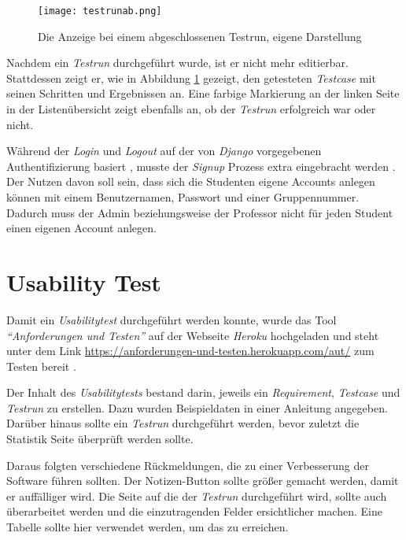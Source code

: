 \documentclass[11pt,a4paper]{report}
\begin{document}
\begin{figure}[htpb]
  \centering
  \texttt{[image: testrunab.png]}
  \caption{Die Anzeige bei einem abgeschlossenen Testrun, eigene Darstellung}
  \label{f:testrunab}
\end{figure}


Nachdem ein \textit{Testrun} durchgeführt wurde, ist er nicht mehr editierbar. Stattdessen zeigt er, wie in Abbildung \ref{f:testrunab} gezeigt, den getesteten \textit{Testcase} mit seinen Schritten und Ergebnissen an. Eine farbige Markierung an der linken Seite in der Listenübersicht zeigt ebenfalls an, ob der \textit{Testrun} erfolgreich war oder nicht.




Während der \textit{Login} und \textit{Logout} auf der von \textit{Django} vorgegebenen Authentifizierung basiert \cite{mozillatuto10}, musste der \textit{Signup} Prozess extra eingebracht werden \cite{signup}. Der Nutzen davon soll sein, dass sich die Studenten eigene Accounts anlegen können mit einem Benutzernamen, Passwort und einer Gruppennummer. Dadurch muss der Admin beziehungsweise der Professor nicht für jeden Student einen eigenen Account anlegen.

 
 



\chapter{Usability Test} \label{chap:use}
Damit ein \textit{Usabilitytest} durchgeführt werden konnte, wurde das Tool \textit{"`Anforderungen und Testen"'} auf der Webseite \textit{Heroku} hochgeladen und steht unter dem Link \url{https://anforderungen-und-testen.herokuapp.com/aut/} zum Testen bereit \cite{heroku}.

Der Inhalt des \textit{Usabilitytests} bestand darin, jeweils ein \textit{Requirement}, \textit{Testcase} und \textit{Testrun} zu erstellen. Dazu wurden Beispieldaten in einer Anleitung angegeben. Darüber hinaus sollte ein \textit{Testrun} durchgeführt werden, bevor zuletzt die Statistik Seite überprüft werden sollte.

Daraus folgten verschiedene Rückmeldungen, die zu einer Verbesserung der Software führen sollten. Der Notizen-Button sollte größer gemacht werden, damit er auffälliger wird. Die Seite auf die der \textit{Testrun} durchgeführt wird, sollte auch überarbeitet werden und die einzutragenden Felder ersichtlicher machen. Eine Tabelle sollte hier verwendet werden, um das zu erreichen.
\end{document}
